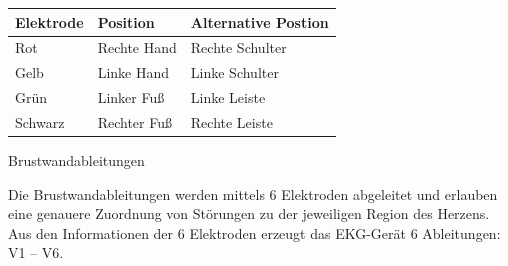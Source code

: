 \documentclass{article}
\begin{document}
\begin{center}
\begin{tabular}{|m{4.367cm}|m{4.367cm}|m{4.367cm}|}
\hline
\centering Elektrode\par

 &
\centering Position\par

 &
\centering Alternative Postion\par

\\\hline
Rot

 &
Rechte Hand

 &
Rechte Schulter

\\\hline
Gelb

 &
Linke Hand

 &
Linke Schulter

\\\hline
Gr\"un

 &
Linker Fu{\ss}

 &
Linke Leiste

\\\hline
Schwarz

 &
Rechter Fu{\ss}

 &
Rechte Leiste

\\\hline
\end{tabular}
\end{center}
Brustwandableitungen

Die Brustwandableitungen werden mittels 6 Elektroden abgeleitet und
erlauben eine genauere Zuordnung von St\"orungen zu der jeweiligen
Region des Herzens. Aus den Informationen der 6 Elektroden erzeugt das
EKG-Ger\"at 6 Ableitungen: V1 -- V6. 
\end{document}

